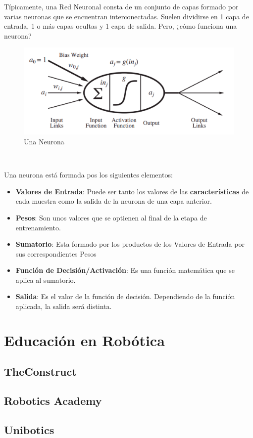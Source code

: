 Típicamente, una Red Neuronal consta de un conjunto de capas formado por varias neuronas que se encuentran interconectadas. Suelen dividirse en 1 capa de entrada, 1 o más capas ocultas y 1 capa de salida. Pero, ¿cómo funciona una neurona?\\


\begin{figure} [h!]
  \begin{center}
    \includegraphics[width=15cm]{imagenes/neurona.png}
  \end{center}
  \caption{Una Neurona \cite{AIMA}}
  \label{fig:neurona}
\end{figure}\

Una neurona está formada pos los siguientes elementos:
\begin{itemize}
	\item \textbf{Valores de Entrada}: Puede ser tanto los valores de las \textbf{características} de cada muestra como la salida de la neurona de una capa anterior.
	\item \textbf{Pesos}: Son unos valores que se optienen al final de la etapa de entrenamiento.
	\item \textbf{Sumatorio}: Esta formado por los productos de los Valores de Entrada por sus correspondientes Pesos
	\item \textbf{Función de Decisión/Activación}: Es una función matemática que se aplica al sumatorio.
	\item \textbf{Salida}: Es el valor de la función de decisión. Dependiendo de la función aplicada, la salida será distinta.
\end{itemize}

\section{Educación en Robótica}
\label{sec:educacion_robotica}

\subsection{TheConstruct}
\label{sec:the_construct}

\subsection{Robotics Academy}
\label{sec:robotics_academy}

\subsection{Unibotics}
\label{sec:unibotics}



